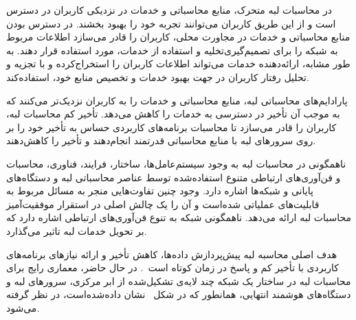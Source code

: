 در محاسبات لبه متحرک، منابع محاسباتی و خدمات در نزدیکی کاربران در دسترس است و از این طریق کاربران می‌توانند تجربه خود را بهبود بخشند. در دسترس بودن منابع محاسباتی و خدمات در مجاورت محلی، کاربران را قادر می‌سازد اطلاعات مربوط به شبکه را برای تصمیم‌گیری‌تخلیه و استفاده از خدمات، مورد استفاده قرار دهند. به طور مشابه، ارائه‌دهنده خدمات می‌تواند اطلاعات کاربران را استخراج‌کرده و با تجزیه و تحلیل رفتار کاربران در جهت بهبود خدمات و تخصیص منابع خود، استفاده‌کند.

پارادایم‌های محاسباتی لبه، منابع محاسباتی و خدمات را به کاربران نزدیک‌تر می‌کنند که به موجب آن تأخیر در دسترسی به خدمات را کاهش می‌دهد. تأخیر کم محاسبات لبه، کاربران را قادر می‌سازد تا محاسبات برنامه‌های کاربردی حساس به تأخیر خود را بر روی سرورهای لبه با منابع محاسباتی قدرتمند انجام‌دهند و تأخیر را کاهش‌دهند.

ناهمگونی در محاسبات لبه به وجود سیستم‌عامل‌ها، ساختار، فرایند، فناوری، محاسبات و فن‌آوری‌های ارتباطی متنوع استفاده‌شده توسط عناصر محاسباتی لبه و دستگاه‌های پایانی و شبکه‌ها اشاره دارد. وجود چنین تفاوت‌هایی منجر به مسائل مربوط به قابلیت‌های عملیاتی شده‌است و آن را یک چالش اصلی در استقرار موفقیت‌آمیز محاسبات لبه ارائه می‌دهد. ناهمگونی شبکه به تنوع فن‌آوری‌های ارتباطی اشاره دارد که بر تحویل خدمات لبه تاثیر می‌گذارد.


هدف اصلی محاسبه لبه پیش‌پردازش داده‌ها، کاهش تأخیر و ارائه نیاز‌های برنامه‌های کاربردی با تأخیر کم و پاسخ در زمان کوتاه است~\cite{shi2016edge}. در حال حاضر، معماری رایج برای محاسبات لبه در ساختار یک شبکه چند لایه‌ی تشکیل‌شده از ابر مرکزی، سرورهای لبه و دستگاه‌های هوشمند انتهایی، همانطور که در شکل~ نشان داده‌شده‌است، در نظر گرفته می‌شود.









